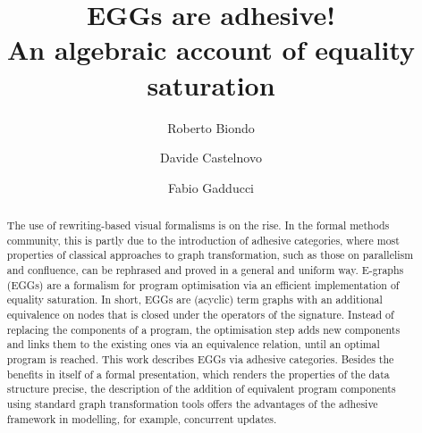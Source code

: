 \documentclass[3p]{elsarticle}
\title{EGGs are adhesive!\\ An algebraic account of equality saturation}
\theoremstyle{remark}
\theoremstyle{definition}
\begin{document}
\author[1]{Roberto Biondo}

\author[1]{Davide Castelnovo%
}

\author[1]{Fabio Gadducci}





\begin{abstract}
The use of rewriting-based visual formalisms is on the rise. 
%
In the formal methods community, this is partly due to the introduction of adhesive
categories, where most properties of classical approaches to graph transformation, 
such as those on parallelism and confluence, can be rephrased and proved in a general and 
uniform way.
%
E-graphs (EGGs) are a formalism for program optimisation 
via an efficient implementation of equality saturation. 
In short, EGGs are (acyclic) term graphs with an additional
equivalence on nodes that is closed under the operators of the signature.
Instead of replacing the components of a program, the optimisation step 
adds new components and links them to 
the existing ones via an equivalence relation, until an optimal program is reached.
%
This work describes EGGs via adhesive categories. 
Besides the benefits in itself of a formal presentation, which renders the 
properties of the data structure precise, the description of the addition of equivalent 
program components using standard graph transformation tools offers the advantages 
of the adhesive framework in modelling, for example, concurrent updates.
%
\end{abstract}


\maketitle

\setcounter{secnumdepth}{4}
\setcounter{tocdepth}{4}
\tableofcontents
\end{document}
